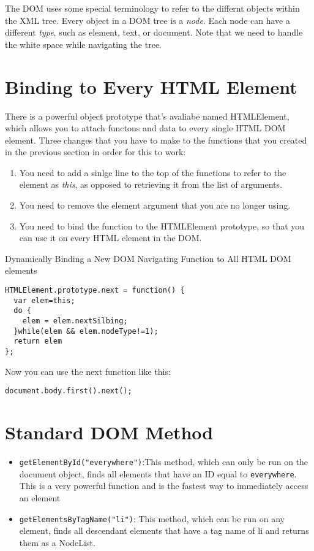\documentclass[a4paper,11pt]{book}
\begin{document}
The DOM uses some special terminology to refer to the differnt objects within
the XML tree. Every object in a DOM tree is a \emph{node}. Each node can have a
different \emph{type}, such as element, text, or document. Note that we need to
handle the white space while navigating the tree.
\section{Binding to Every HTML Element}
There is a powerful object prototype that's avaliabe named HTMLElement, which
allows you to attach functons and data to every single HTML DOM element. Three
changes that you have to make to the functions that you created in the previous
section in order for this to work:
\begin{enumerate}
\item You need to add a sinlge line to the top of the functions to refer to the
element as \emph{this}, as opposed to retrieving it from the list of arguments.
\item You need to remove the element argument that you are no longer using. 
\item You need to bind the function to the HTMLElement prototype, so that you
can use it on every HTML element in the DOM.
\end{enumerate}

Dynamically Binding a New DOM Navigating Function to All HTML DOM elements
\begin{verbatim}
HTMLElement.prototype.next = function() {
  var elem=this;
  do {
    elem = elem.nextSilbing;
  }while(elem && elem.nodeType!=1);
  return elem
};
\end{verbatim}
Now you can use the next function like this:
\begin{verbatim}
document.body.first().next();
\end{verbatim}

\section{Standard DOM Method}
\begin{itemize}
\item \verb|getElementById("everywhere")|:This method, which can only be run on
the document object, finds all elements that have an ID equal to
\verb|everywhere|. This is a very powerful function and is the fastest way to
immediately access an element
\item \verb|getElementsByTagName("li")|: This method, which can be run on any
element, finds all descendant elements that have a tag name of li and returns
them as a NodeList.
\end{itemize}
\end{document}
